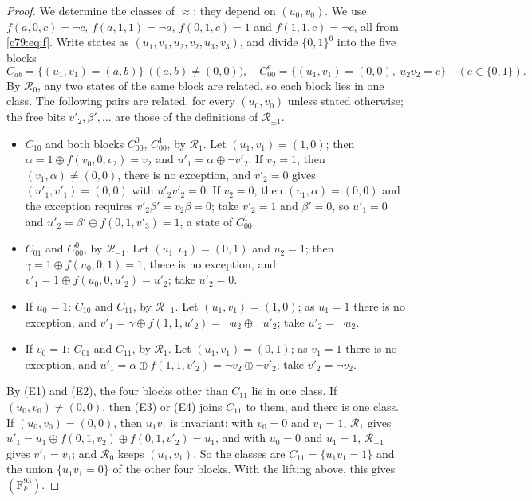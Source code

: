 \begin{proof}
We determine the classes of $\approx$; they depend on $(u_0,v_0)$. We use $f(a,0,c)=\neg c$, $f(a,1,1)=\neg a$, $f(0,1,c)=1$ and $f(1,1,c)=\neg c$, all from \eqref{c79:eq:f}. Write states as $(u_1,v_1,u_2,v_2,u_3,v_3)$, and divide $\{0,1\}^6$ into the five blocks
\[
C_{ab}=\{(u_1,v_1)=(a,b)\}\ \ \bigl((a,b)\ne(0,0)\bigr),\quad C_{00}^{e}=\{(u_1,v_1)=(0,0),\ u_2v_2=e\}\quad(e\in\{0,1\}).
\]
By $\mathcal R_0$, any two states of the same block are related, so each block lies in one class. The following pairs are related, for every $(u_0,v_0)$ unless stated otherwise; the free bits $v'_2,\beta',\dots$ are those of the definitions of $\mathcal R_{\pm1}$.
\begin{itemize}
\item[(E1)] $C_{10}$ and both blocks $C_{00}^0$, $C_{00}^1$, by $\mathcal R_1$. Let $(u_1,v_1)=(1,0)$; then $\alpha=1\oplus f(v_0,0,v_2)=v_2$ and $u'_1=\alpha\oplus\neg v'_2$. If $v_2=1$, then $(v_1,\alpha)\ne(0,0)$, there is no exception, and $v'_2=0$ gives $(u'_1,v'_1)=(0,0)$ with $u'_2v'_2=0$. If $v_2=0$, then $(v_1,\alpha)=(0,0)$ and the exception requires $v'_2\beta'=v_2\beta=0$; take $v'_2=1$ and $\beta'=0$, so $u'_1=0$ and $u'_2=\beta'\oplus f(0,1,v'_3)=1$, a state of $C_{00}^1$.
\item[(E2)] $C_{01}$ and $C_{00}^0$, by $\mathcal R_{-1}$. Let $(u_1,v_1)=(0,1)$ and $u_2=1$; then $\gamma=1\oplus f(u_0,0,1)=1$, there is no exception, and $v'_1=1\oplus f(u_0,0,u'_2)=u'_2$; take $u'_2=0$.
\item[(E3)] If $u_0=1$: $C_{10}$ and $C_{11}$, by $\mathcal R_{-1}$. Let $(u_1,v_1)=(1,0)$; as $u_1=1$ there is no exception, and $v'_1=\gamma\oplus f(1,1,u'_2)=\neg u_2\oplus\neg u'_2$; take $u'_2=\neg u_2$.
\item[(E4)] If $v_0=1$: $C_{01}$ and $C_{11}$, by $\mathcal R_1$. Let $(u_1,v_1)=(0,1)$; as $v_1=1$ there is no exception, and $u'_1=\alpha\oplus f(1,1,v'_2)=\neg v_2\oplus\neg v'_2$; take $v'_2=\neg v_2$.
\end{itemize}
By (E1) and (E2), the four blocks other than $C_{11}$ lie in one class. If $(u_0,v_0)\ne(0,0)$, then (E3) or (E4) joins $C_{11}$ to them, and there is one class. If $(u_0,v_0)=(0,0)$, then $u_1v_1$ is invariant: with $v_0=0$ and $v_1=1$, $\mathcal R_1$ gives $u'_1=u_1\oplus f(0,1,v_2)\oplus f(0,1,v'_2)=u_1$, and with $u_0=0$ and $u_1=1$, $\mathcal R_{-1}$ gives $v'_1=v_1$; and $\mathcal R_0$ keeps $(u_1,v_1)$. So the classes are $C_{11}=\{u_1v_1=1\}$ and the union $\{u_1v_1=0\}$ of the other four blocks. With the lifting above, this gives $(\mathrm F^{93}_k)$.
\end{proof}


